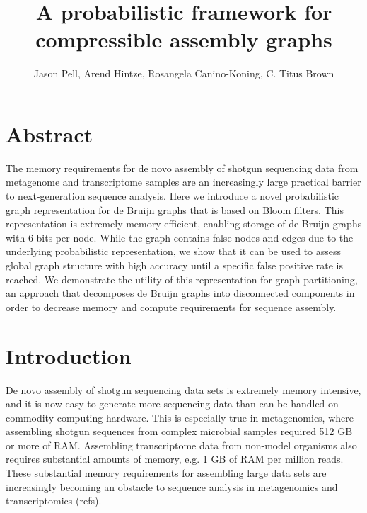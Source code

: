 \documentclass[12pt]{article} \usepackage{simplemargins}
\begin{document}
\title{A probabilistic framework for compressible assembly graphs}
\author{Jason Pell, Arend Hintze, Rosangela Canino-Koning, C. Titus Brown}

\maketitle

\section{Abstract}

The memory requirements for de novo assembly of shotgun sequencing
data from metagenome and transcriptome samples are an increasingly
large practical barrier to next-generation sequence analysis.  Here we
introduce a novel probabilistic graph representation for de Bruijn
graphs that is based on Bloom filters.  This representation is
extremely memory efficient, enabling storage of de Bruijn graphs with
6 bits per node.  While the graph contains false nodes and
edges due to the underlying probabilistic representation, we show that
it can be used to assess global graph structure with high accuracy
until a specific false positive rate is reached.  We demonstrate the
utility of this representation for graph partitioning, an approach
that decomposes de Bruijn graphs into disconnected components in order
to decrease memory and compute requirements for sequence assembly.


\section{Introduction}

De novo assembly of shotgun sequencing data sets is extremely memory
intensive, and it is now easy to generate more sequencing data than
can be handled on commodity computing hardware.  This is especially
true in metagenomics, where assembling shotgun sequences
from complex microbial samples required 512 GB or more of 
RAM\cite{pmid20203603, pmid21273488}.  Assembling transcriptome data from non-model
organisms also requires substantial amounts of memory, e.g. 1 GB of
RAM per million reads\cite{trinity}.  These substantial memory requirements for
assembling large data sets are increasingly becoming an obstacle to
sequence analysis in metagenomics and transcriptomics (refs).
\end{document}
